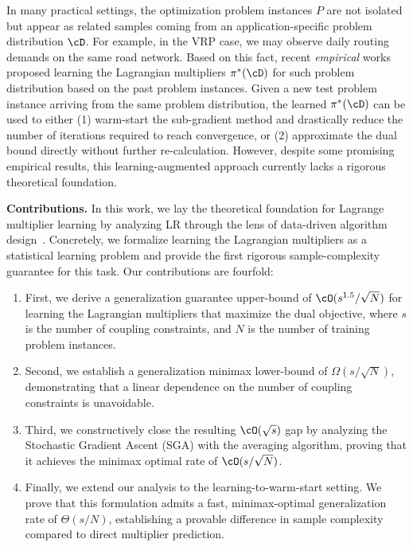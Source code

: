 \documentclass{article}
\theoremstyle{plain}
\theoremstyle{definition}
\theoremstyle{remark}
\begin{document}
In many practical settings, the optimization problem instances $P$ are not isolated but appear as related samples coming from an application-specific problem distribution $\cD$. For example, in the VRP case, we may observe daily routing demands on the same road network. Based on this fact, recent \textit{empirical} works~\citep{demelas2024predicting} proposed learning the Lagrangian multipliers $\pi^*(\cD)$ for such problem distribution based on the past problem instances. Given a new test problem instance arriving from the same problem distribution, the learned $\pi^*(\cD)$ can be used to either (1) warm-start the sub-gradient method and drastically reduce the number of iterations required to reach convergence, or (2) approximate the dual bound directly without further re-calculation. However, despite some promising empirical results, this learning-augmented approach currently lacks a rigorous theoretical foundation. 



\textbf{Contributions.} In this work, we lay the theoretical foundation for Lagrange multiplier learning by analyzing LR through the lens of data-driven algorithm design~\citep{gupta2020data, balcan2020data}. Concretely, we formalize learning the Lagrangian multipliers as a statistical learning problem and provide the first rigorous sample-complexity guarantee for this task. Our contributions are fourfold:
\begin{enumerate}[leftmargin=*]
    \item First, we derive a generalization guarantee upper-bound of $\cO(s^{1.5}/\sqrt{N})$ for learning the Lagrangian multipliers that maximize the dual objective, where $s$ is the number of coupling constraints, and $N$ is the number of training problem instances.
    \item Second, we establish a generalization minimax lower-bound of $\Omega(s/\sqrt{N})$, demonstrating that a linear dependence on the number of coupling constraints is unavoidable. 
    \item Third, we constructively close the resulting $\cO(\sqrt{s})$ gap by analyzing the Stochastic Gradient Ascent (SGA) with the averaging algorithm, proving that it achieves the minimax optimal rate of $\cO(s/\sqrt{N})$.
    \item Finally, we extend our analysis to the learning-to-warm-start setting. We prove that this formulation admits a fast, minimax-optimal generalization rate of $\Theta(s/N)$, establishing a provable difference in sample complexity compared to direct multiplier prediction.
\end{enumerate}
\end{document}
